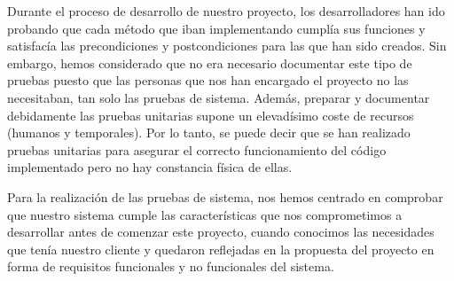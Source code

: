 Durante el proceso de desarrollo de nuestro proyecto, los desarrolladores han ido probando que cada método que iban
implementando cumplía sus funciones y satisfacía las precondiciones y postcondiciones para las que han sido creados.
Sin embargo, hemos considerado que no era necesario documentar este tipo de pruebas puesto que las personas que nos 
han encargado el proyecto no las necesitaban, tan solo las pruebas de sistema. Además, preparar y documentar debidamente
las pruebas unitarias supone un elevadísimo coste de recursos (humanos y temporales). Por lo tanto, se puede decir que se han realizado pruebas unitarias para asegurar el correcto funcionamiento del código implementado pero no hay constancia física de ellas.

Para la realización de las pruebas de sistema, nos hemos centrado en comprobar que nuestro sistema cumple las características que nos comprometimos a desarrollar antes de comenzar este proyecto, cuando conocimos las necesidades que tenía nuestro cliente y quedaron reflejadas en la propuesta del proyecto en forma de requisitos funcionales y no funcionales del sistema.

